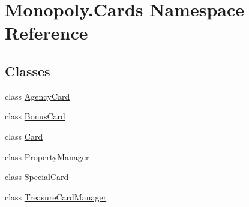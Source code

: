 \hypertarget{namespace_monopoly_1_1_cards}{}\section{Monopoly.\+Cards Namespace Reference}
\label{namespace_monopoly_1_1_cards}
\subsection*{Classes}
\begin{DoxyCompactItemize}
\item 
class \mbox{\hyperlink{class_monopoly_1_1_cards_1_1_agency_card}{Agency\+Card}}
\item 
class \mbox{\hyperlink{class_monopoly_1_1_cards_1_1_bonus_card}{Bonus\+Card}}
\item 
class \mbox{\hyperlink{class_monopoly_1_1_cards_1_1_card}{Card}}
\item 
class \mbox{\hyperlink{class_monopoly_1_1_cards_1_1_property_manager}{Property\+Manager}}
\item 
class \mbox{\hyperlink{class_monopoly_1_1_cards_1_1_special_card}{Special\+Card}}
\item 
class \mbox{\hyperlink{class_monopoly_1_1_cards_1_1_treasure_card_manager}{Treasure\+Card\+Manager}}
\end{DoxyCompactItemize}
